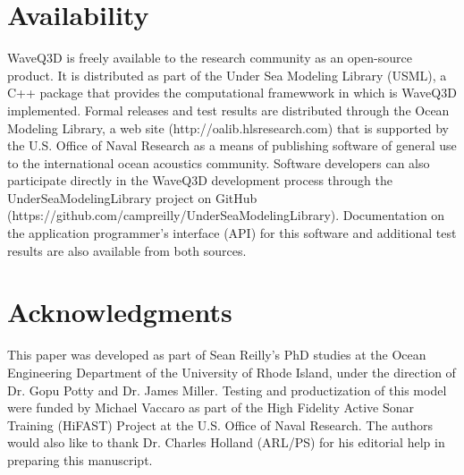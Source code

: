 \documentclass{ws-jca}
\begin{document}
\section{Availability}

WaveQ3D is freely available to the research community as an open-source product.  It is distributed as part of the Under Sea Modeling Library (USML), a C++ package that provides the computational framewwork in which is WaveQ3D implemented.  Formal releases and test results are distributed through the Ocean Modeling Library, a web site (http://oalib.hlsresearch.com) that is supported by the U.S. Office of Naval Research as a means of publishing software of general use to the international ocean acoustics community.  Software developers can also participate directly in the WaveQ3D development process through the UnderSeaModelingLibrary project on GitHub (https://github.com/campreilly/UnderSeaModelingLibrary).  Documentation on the application programmer's interface (API) for this software and additional test results are also available from both sources.

\section*{Acknowledgments}

This paper was developed as part of Sean Reilly's PhD studies at the Ocean Engineering Department of the University of Rhode Island, under the direction of Dr. Gopu Potty and Dr. James Miller. Testing and productization of this model were funded by Michael Vaccaro as part of the High Fidelity Active Sonar Training (HiFAST) Project at the U.S. Office of Naval Research. The authors would also like to thank Dr. Charles Holland (ARL/PS) for his editorial help in preparing this manuscript.
\end{document}
